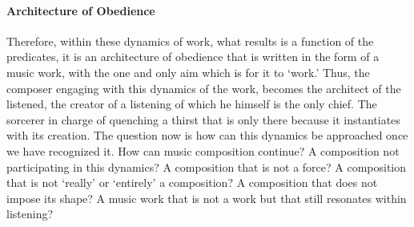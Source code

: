 \paragraph{Architecture of Obedience}
Therefore, within these dynamics of work, what results is a function of the predicates, it is an architecture of obedience that is written in the form of a music work, with the one and only aim which is for it to `work.' Thus, the composer engaging with this dynamics of the work, becomes the architect of the listened, the creator of a listening of which he himself is the only chief. The sorcerer in charge of quenching a thirst that is only there because it  instantiates with its creation. The question now is how can this dynamics be approached once we have recognized it. How can music composition continue? A composition not participating in this dynamics? A composition that is not a force? A composition that is not `really' or `entirely' a composition? A composition that does not impose its shape? A music work that is not a work but that still resonates within listening?


% 

